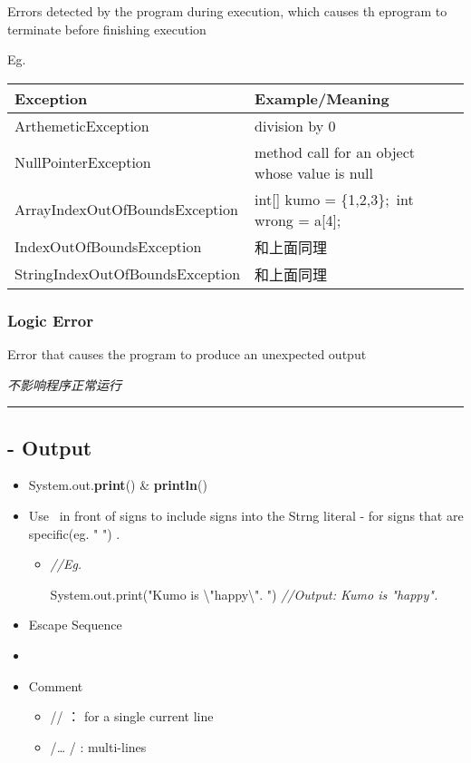 \documentclass[
  paper=a4,
  ,captions=tableheading
]{scrartcl}
\newenvironment{Shaded}{}{}
\newcommand{\BuiltInTok}[1]{#1}
\newcommand{\CommentTok}[1]{\textcolor[rgb]{0.38,0.63,0.69}{\textit{#1}}}
\newcommand{\FunctionTok}[1]{\textcolor[rgb]{0.02,0.16,0.49}{#1}}
\newcommand{\NormalTok}[1]{#1}
\newcommand{\SpecialCharTok}[1]{\textcolor[rgb]{0.25,0.44,0.63}{#1}}
\newcommand{\StringTok}[1]{\textcolor[rgb]{0.25,0.44,0.63}{#1}}
\begin{document}
Errors detected by the program during execution, which causes th
eprogram to terminate before finishing execution

Eg.

\begin{longtable}[]{@{}ll@{}}
\toprule
Exception & Example/Meaning\tabularnewline
\midrule
\endhead
ArthemeticException & division by 0\tabularnewline
NullPointerException & method call for an object whose value is
null\tabularnewline
ArrayIndexOutOfBoundsException & int{[}{]} kumo = \{1,2,3\};~int wrong =
a{[}4{]};\tabularnewline
IndexOutOfBoundsException & 和上面同理\tabularnewline
StringIndexOutOfBoundsException & 和上面同理\tabularnewline
\bottomrule
\end{longtable}

\hypertarget{logic-error}{%
\subsubsection{Logic Error}\label{logic-error}}

Error that causes the program to produce an unexpected output

\emph{不影响程序正常运行}

\begin{center}\rule{0.5\linewidth}{\linethickness}\end{center}

\hypertarget{output}{%
\subsection{- Output}\label{output}}

\begin{itemize}
\item
  System.out.\textbf{print}() \& \textbf{println}()
\item
  Use ~in front of signs to include signs into the Strng literal - for
  signs that are specific(eg. " ") .

  \begin{itemize}
  \item
\begin{Shaded}
\begin{Highlighting}[]
\CommentTok{//Eg.}

\BuiltInTok{System}\NormalTok{.}\FunctionTok{out}\NormalTok{.}\FunctionTok{print}\NormalTok{(}\StringTok{"Kumo is }\SpecialCharTok{\textbackslash{}"}\StringTok{happy}\SpecialCharTok{\textbackslash{}"}\StringTok{. "}\NormalTok{)}
\CommentTok{//Output: Kumo is "happy".}
\end{Highlighting}
\end{Shaded}
  \end{itemize}
\item
  Escape Sequence
\item
\item
  Comment

  \begin{itemize}
  \item
    // ： for a single current line
  \item
    /\emph{\ldots{} }/ : multi-lines
  \end{itemize}
\end{itemize}
\end{document}
